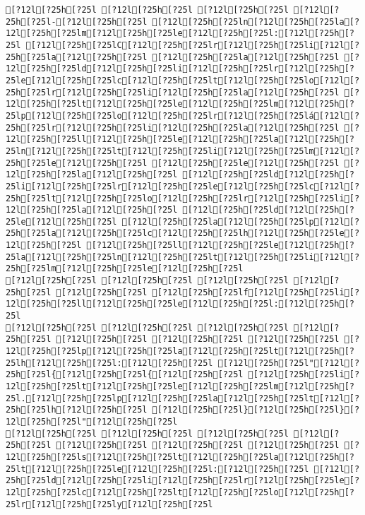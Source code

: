 \documentclass{scrartcl}
\begin{document}
\begin{Verbatim}
[?12l[?25h[?25l [?12l[?25h[?25l [?12l[?25h[?25l [?12l[?25h[?25l-[?12l[?25h[?25l [?12l[?25h[?25ln[?12l[?25h[?25la[?12l[?25h[?25lm[?12l[?25h[?25le[?12l[?25h[?25l:[?12l[?25h[?25l [?12l[?25h[?25lC[?12l[?25h[?25lr[?12l[?25h[?25li[?12l[?25h[?25la[?12l[?25h[?25l [?12l[?25h[?25la[?12l[?25h[?25l [?12l[?25h[?25ld[?12l[?25h[?25li[?12l[?25h[?25lr[?12l[?25h[?25le[?12l[?25h[?25lc[?12l[?25h[?25lt[?12l[?25h[?25lo[?12l[?25h[?25lr[?12l[?25h[?25li[?12l[?25h[?25la[?12l[?25h[?25l [?12l[?25h[?25lt[?12l[?25h[?25le[?12l[?25h[?25lm[?12l[?25h[?25lp[?12l[?25h[?25lo[?12l[?25h[?25lr[?12l[?25h[?25lá[?12l[?25h[?25lr[?12l[?25h[?25li[?12l[?25h[?25la[?12l[?25h[?25l [?12l[?25h[?25ll[?12l[?25h[?25le[?12l[?25h[?25la[?12l[?25h[?25ln[?12l[?25h[?25lt[?12l[?25h[?25li[?12l[?25h[?25lm[?12l[?25h[?25le[?12l[?25h[?25l [?12l[?25h[?25le[?12l[?25h[?25l [?12l[?25h[?25la[?12l[?25h[?25l [?12l[?25h[?25ld[?12l[?25h[?25li[?12l[?25h[?25lr[?12l[?25h[?25le[?12l[?25h[?25lc[?12l[?25h[?25lt[?12l[?25h[?25lo[?12l[?25h[?25lr[?12l[?25h[?25li[?12l[?25h[?25la[?12l[?25h[?25l [?12l[?25h[?25ld[?12l[?25h[?25le[?12l[?25h[?25l [?12l[?25h[?25la[?12l[?25h[?25lp[?12l[?25h[?25la[?12l[?25h[?25lc[?12l[?25h[?25lh[?12l[?25h[?25le[?12l[?25h[?25l [?12l[?25h[?25ll[?12l[?25h[?25le[?12l[?25h[?25la[?12l[?25h[?25ln[?12l[?25h[?25lt[?12l[?25h[?25li[?12l[?25h[?25lm[?12l[?25h[?25le[?12l[?25h[?25l
[?12l[?25h[?25l [?12l[?25h[?25l [?12l[?25h[?25l [?12l[?25h[?25l [?12l[?25h[?25l [?12l[?25h[?25lf[?12l[?25h[?25li[?12l[?25h[?25ll[?12l[?25h[?25le[?12l[?25h[?25l:[?12l[?25h[?25l
[?12l[?25h[?25l [?12l[?25h[?25l [?12l[?25h[?25l [?12l[?25h[?25l [?12l[?25h[?25l [?12l[?25h[?25l [?12l[?25h[?25l [?12l[?25h[?25lp[?12l[?25h[?25la[?12l[?25h[?25lt[?12l[?25h[?25lh[?12l[?25h[?25l:[?12l[?25h[?25l [?12l[?25h[?25l"[?12l[?25h[?25l{[?12l[?25h[?25l{[?12l[?25h[?25l [?12l[?25h[?25li[?12l[?25h[?25lt[?12l[?25h[?25le[?12l[?25h[?25lm[?12l[?25h[?25l.[?12l[?25h[?25lp[?12l[?25h[?25la[?12l[?25h[?25lt[?12l[?25h[?25lh[?12l[?25h[?25l [?12l[?25h[?25l}[?12l[?25h[?25l}[?12l[?25h[?25l"[?12l[?25h[?25l
[?12l[?25h[?25l [?12l[?25h[?25l [?12l[?25h[?25l [?12l[?25h[?25l [?12l[?25h[?25l [?12l[?25h[?25l [?12l[?25h[?25l [?12l[?25h[?25ls[?12l[?25h[?25lt[?12l[?25h[?25la[?12l[?25h[?25lt[?12l[?25h[?25le[?12l[?25h[?25l:[?12l[?25h[?25l [?12l[?25h[?25ld[?12l[?25h[?25li[?12l[?25h[?25lr[?12l[?25h[?25le[?12l[?25h[?25lc[?12l[?25h[?25lt[?12l[?25h[?25lo[?12l[?25h[?25lr[?12l[?25h[?25ly[?12l[?25h[?25l

\end{Verbatim}
\end{document}
